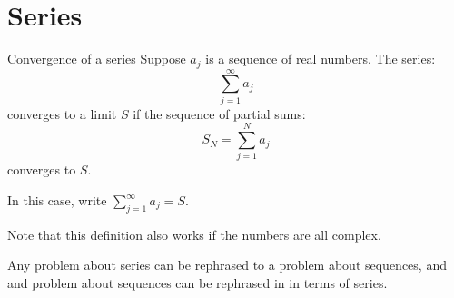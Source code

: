 \documentclass[../Main.tex]{subfiles}
\begin{document}
\section{Series}
\begin{definition}{Convergence of a series}
    Suppose $a_j$ is a sequence of real numbers. The series:
    \begin{equation*}
        \sum_{j=1}^{\infty} a_j
    \end{equation*}
    converges to a limit $S$ if the sequence of partial sums:
    \begin{equation*}
        S_N = \sum_{j=1}^{N} a_j
    \end{equation*}
    converges to $S$.\par
    In this case, write $\sum_{j=1}^\infty a_j = S$.
\end{definition}
Note that this definition also works if the numbers are all complex.
\begin{remark}
    Any problem about series can be rephrased to a problem about sequences, and and problem about sequences can be rephrased in in terms of series.
\end{remark}
\end{document}
